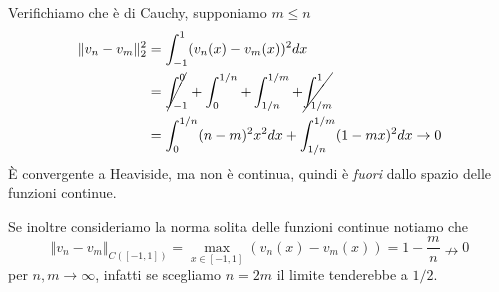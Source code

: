 \documentclass[10pt,a4paper,twoside,openright]{book}
\begin{document}
Verifichiamo che è di Cauchy, supponiamo $\displaystyle m\leqslant n$
\begin{align*}
	\Vert v_{n} -v_{m}\Vert ^{2}_{2} & =\int ^{1}_{-1}(v_{n}(x) -v_{m}(x))^{2} dx                                             \\
	                                 & =\cancel{\int ^{0}_{-1}} +\int ^{1/n}_{0} +\int ^{1/m}_{1/n} +\cancel{\int ^{1}_{1/m}} \\
	                                 & =\int ^{1/n}_{0}(n-m)^{2} x^{2} dx+\int ^{1/m}_{1/n}(1-mx)^{2} dx\rightarrow 0         
\end{align*}
È convergente a Heaviside, ma non è continua, quindi è \textit{fuori} dallo spazio delle funzioni continue.

Se inoltre consideriamo la norma solita delle funzioni continue notiamo che
\begin{equation*}
	\Vert v_{n} -v_{m}\Vert _{C([ -1,1])} =\max_{x\in [ -1,1]}(v_{n}(x) -v_{m}(x)) =1-\frac{m}{n} \nrightarrow 0
\end{equation*}
per $n,m\rightarrow \infty $, infatti se scegliamo $\displaystyle n=2m$ il limite tenderebbe a $\displaystyle 1/2$.
\end{document}

